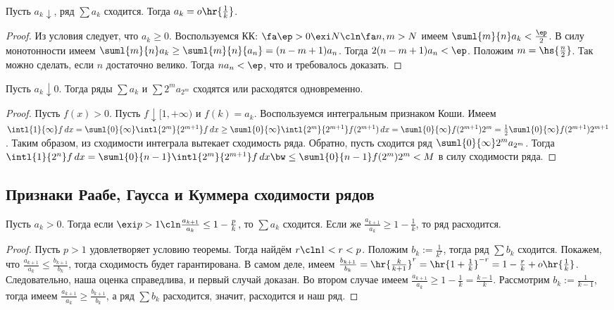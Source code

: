 \documentclass[a4paper]{article}
\begin{document}
\begin{theorem}
Пусть $a_k \downarrow$, ряд $\sum a_k$ сходится. Тогда $a_k = o \hr{ \frac{1}{k}}$.
\end{theorem}
\begin{proof}
Из условия следует, что $a_k \ge 0$. Воспользуемся КК: $\fa \ep > 0 \exi N\cln \fa n, m > N$ имеем $\suml{m}{n} a_k < \frac{\ep}{2}$.
В силу монотонности имеем $\suml{m}{n}a_k \ge \suml{m}{n}{a_n} = (n-m+1)a_n$. Тогда $2(n-m+1)a_n < \ep$. Положим $m=\hs{\frac{n}{2}}$.
Так можно сделать, если $n$ достаточно велико. Тогда $na_n < \ep$, что и требовалось доказать.
\end{proof}

\begin{theorem}[Коши]
Пусть $a_k \downarrow 0$. Тогда ряды $\sum a_k$ и $\sum 2^ma_{2^m}$ сходятся или расходятся одновременно.
\end{theorem}
\begin{proof}
Пусть $f(x) > 0$. Пусть $f \downarrow [1,+\infty)$ и $f(k) = a_k$. Воспользуемся интегральным
признаком Коши. Имеем $\intl{1}{\infty} f\,d x=\suml{0}{\infty}\intl{2^m}{2^{m+1}}f\,d x \ge
\suml{0}{\infty}\intl{2^m}{2^{m+1}}f(2^{m+1})\,d x=
\suml{0}{\infty}f(2^{m+1})2^m=\frac{1}{2}\suml{0}{\infty}f(2^{m+1})2^{m+1}$. Таким образом, из
сходимости интеграла вытекает сходимость ряда. Обратно, пусть сходится ряд
$\suml{0}{\infty}2^ma_{2^m}$. Тогда $\intl{1}{2^n}f\,d x=\suml{0}{n-1}\intl{2^m}{2^{m+1}}f\,d x
\bw\le \suml{0}{n-1}f(2^m)2^m < M$ в силу сходимости ряда.
\end{proof}

\subsection{Признаки Раабе, Гаусса и Куммера сходимости рядов}

\begin{theorem}
Пусть $a_k > 0$. Тогда если $\exi p > 1\cln \frac{a_{k+1}}{a_k} \le 1 - \frac{p}{k}$, то $\sum a_k$
сходится. Если же $\frac{a_{k+1}}{a_k} \ge 1 - \frac{1}{k}$, то ряд расходится.
\end{theorem}
\begin{proof}
Пусть $p>1$ удовлетворяет условию теоремы. Тогда найдём $r\cln 1<r<p$. Положим $b_k := \frac{1}{k^r}$, тогда ряд $\sum b_k$ сходится. Покажем, что
$\frac{a_{k+1}}{a_k} \le \frac{b_{k+1}}{b_k}$, тогда сходимость будет гарантирована. В самом деле, имеем $\frac{b_{k+1}}{b_k} =
\hr{ \frac{k}{k+1}} ^r=\hr{ 1+\frac{1}{k}} ^{-r}=1-\frac{r}{k}+o\hr{\frac{1}{k}}$. Следовательно, наша оценка справедлива, и первый случай доказан.
Во втором случае имеем $\frac{a_{k+1}}{a_k} \ge 1-\frac{1}{k}=\frac{k-1}{k}$. Рассмотрим $b_k :=\frac{1}{k-1}$, тогда имеем
$\frac{a_{k+1}}{a_k} \ge \frac{b_{k+1}}{b_k}$, а ряд $\sum b_k$ расходится, значит, расходится и наш ряд.
\end{proof}
\end{document}
